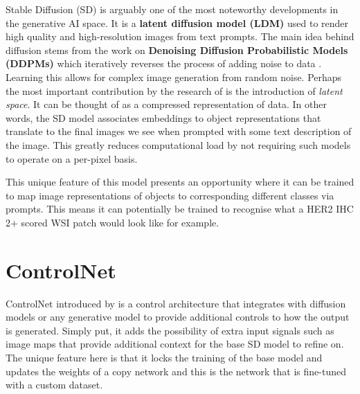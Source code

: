 Stable Diffusion (SD) is arguably one of the most noteworthy developments in the generative AI space. It is a  \textbf{latent diffusion model (LDM)} \parencite{Rombach2021High-ResolutionModels} used to render high quality and high-resolution images from text prompts. The main idea behind diffusion stems from the work on \textbf{Denoising Diffusion Probabilistic Models (DDPMs)} which iteratively reverses the process of adding noise to data \parencite{Ho2020DenoisingModels}. Learning this allows for complex image generation from random noise. Perhaps the most important contribution by the research of  \textcite{Rombach2021High-ResolutionModels} is the introduction of \textit{latent space}. It can be thought of as a compressed representation of data. In other words, the SD model associates embeddings to object representations that translate to the final images we see when prompted with some text description of the image. This greatly reduces computational load by not requiring such models to operate on a per-pixel basis.

This unique feature of this model presents an opportunity where it can be trained to map image representations of objects to corresponding different classes via prompts. This means it can potentially be trained to recognise what a HER2 IHC 2+ scored WSI patch would look like for example. 

\section{ControlNet}

ControlNet introduced by \textcite{Zhang2023AddingModels} is a control architecture that integrates with diffusion models or any generative model to provide additional controls to how the output is generated. Simply put, it adds the possibility of extra input signals such as image maps that provide additional context for the base SD model to refine on. The unique feature here is that it locks the training of the base model and updates the weights of a copy network and this is the network that is fine-tuned with a custom dataset. 




